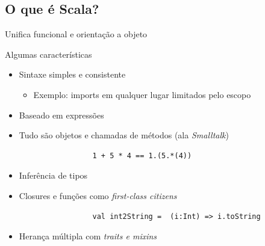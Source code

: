 \documentclass{beamer}
\begin{document}
\subsection{O que é Scala?}

\begin{frame}{Unifica funcional e orientação a objeto} 
\end{frame}

\begin{frame}[fragile]{Algumas características} 
    \begin{itemize} %
        \item Sintaxe simples e consistente 
        \begin{itemize}
              \item Exemplo: imports em qualquer lugar limitados pelo escopo 
        \end{itemize}
        \item Baseado em expressões
        \item Tudo são objetos e chamadas de métodos (ala \emph{Smalltalk})
             \begin{lstlisting}
                 1 + 5 * 4 == 1.(5.*(4))
             \end{lstlisting}
        \item Inferência de tipos
        \item Closures e funções como \emph{first-class citizens}
             \begin{lstlisting}
                 val int2String =  (i:Int) => i.toString
             \end{lstlisting}
         \item Herança múltipla com \emph{traits e mixins}
    \end{itemize}
\end{frame}
\end{document}
